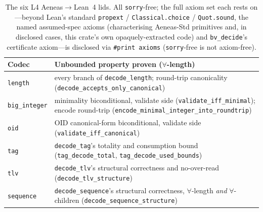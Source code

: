 \documentclass[10pt,twocolumn]{article}
\newcommand{\code}[1]{\texttt{\small #1}}
\begin{document}
\begin{table}[t]
\centering
\footnotesize
\begin{tabular}{@{}lp{4.4cm}@{}}
\toprule
Codec & Unbounded property proven ($\forall$-length) \\
\midrule
\code{length} & every branch of \code{decode\_length}; round-trip canonicality (\code{decode\allowbreak\_accepts\allowbreak\_only\allowbreak\_canonical}) \\
\code{big\_integer} & minimality biconditional, validate side (\code{validate\allowbreak\_iff\allowbreak\_minimal}); encode round-trip (\code{encode\allowbreak\_minimal\allowbreak\_integer\allowbreak\_into\allowbreak\_roundtrip}) \\
\code{oid} & OID canonical-form biconditional, validate side (\code{validate\allowbreak\_iff\allowbreak\_canonical}) \\
\code{tag} & \code{decode\_tag}'s totality and consumption bound (\code{tag\allowbreak\_decode\allowbreak\_total}, \code{tag\allowbreak\_decode\allowbreak\_used\allowbreak\_bounds}) \\
\code{tlv} & \code{decode\_tlv}'s structural correctness and no-over-read (\code{decode\allowbreak\_tlv\allowbreak\_structure}) \\
\code{sequence} & \code{decode\_sequence}'s structural correctness, $\forall$-length \emph{and} $\forall$-children (\code{decode\allowbreak\_sequence\allowbreak\_structure}) \\
\bottomrule
\end{tabular}
\caption{The six L4 Aeneas${\to}$Lean~4 lids. All \code{sorry}-free; the full
axiom set each rests on---beyond Lean's standard \code{propext} /
\code{Classical.choice} / \code{Quot.sound}, the named assumed-spec axioms
(characterising Aeneas-Std primitives and, in disclosed cases, this crate's own
opaquely-extracted code) and \code{bv\_decide}'s certificate axiom---is disclosed via
\code{\#print axioms} (\code{sorry}-free is not axiom-free).}
\label{tab:l4}
\end{table}
\end{document}
